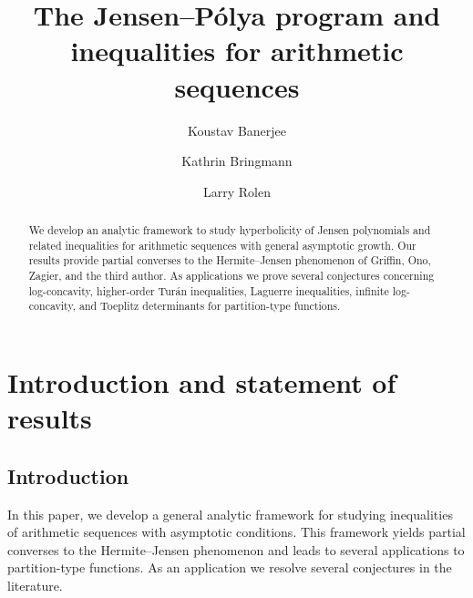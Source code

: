 \documentclass[11pt,reqno,a4paper]{amsart}
\title{The Jensen--P\'olya program and inequalities for arithmetic sequences}
\author{Koustav Banerjee}
\author{Kathrin Bringmann}
\author{Larry Rolen}
\renewcommand{\(}{\left\(}
\renewcommand{\)}{\right\)}
\numberwithin{equation}{section}
\theoremstyle{plain}
\theoremstyle{definition} %
\numberwithin{equation}{section}
\begin{document}
	\maketitle
	
\begin{abstract}
We develop an analytic framework to study hyperbolicity of Jensen polynomials and related inequalities for arithmetic sequences with general asymptotic growth. Our results provide partial converses to the Hermite–Jensen phenomenon of Griffin, Ono, Zagier, and the third author. As applications we prove several conjectures concerning log-concavity, higher-order Turán inequalities, Laguerre inequalities, infinite log-concavity, and Toeplitz determinants for partition-type functions.
\end{abstract}





\section{Introduction and statement of results}\hspace{0 cm}




\subsection{Introduction}  In this paper, we develop a general analytic framework for studying inequalities of arithmetic sequences with asymptotic conditions. This framework yields partial converses to the Hermite–Jensen phenomenon and leads to several applications to partition-type functions. As an application we resolve several conjectures in the literature.  
\end{document}
